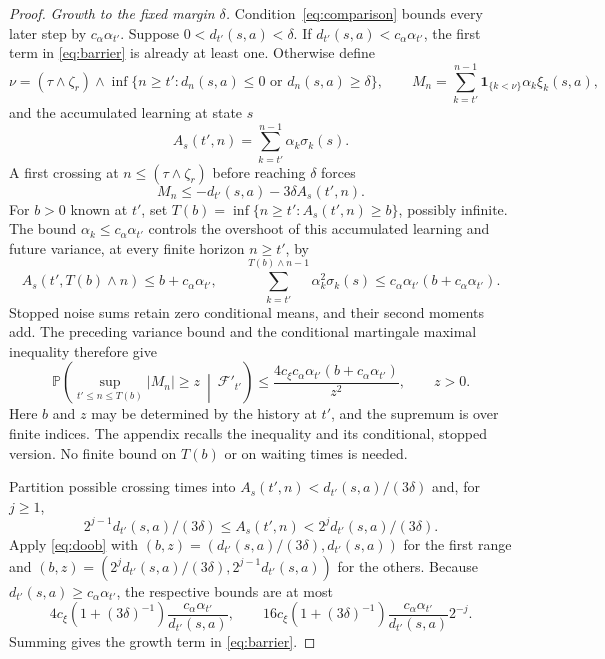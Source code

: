 \begin{proof}
\emph{Growth to the fixed margin $\delta$.} Condition~\eqref{eq:comparison} bounds every later step by $c_\alpha\alpha_{t'}$. Suppose $0<d_{t'}(s,a)<\delta$. If $d_{t'}(s,a)<c_\alpha\alpha_{t'}$, the first term in \eqref{eq:barrier} is already
at least one. Otherwise define
\[
\nu=(\tau\wedge\zeta_r)\wedge\inf\{n\ge t':d_n(s,a)\le0\text{ or }d_n(s,a)\ge\delta\},\qquad
M_n=\sum_{k=t'}^{n-1}\mathbf1_{\{k<\nu\}}\alpha_k\xi_k(s,a),
\]
and the accumulated learning at state $s$
\begin{equation}\label{eq:clock}
A_s(t',n)=\sum_{k=t'}^{n-1}\alpha_k\sigma_k(s).
\end{equation}
A first crossing at $n\le(\tau\wedge\zeta_r)$ before reaching $\delta$ forces
\begin{equation}\label{eq:crossing}
M_n\le-d_{t'}(s,a)-3\delta A_s(t',n).
\end{equation}
For $b>0$ known at $t'$, set $T(b)=\inf\{n\ge t':A_s(t',n)\ge b\}$, possibly infinite. The bound $\alpha_k\le c_\alpha\alpha_{t'}$ controls the overshoot of this accumulated learning and future variance, at every finite horizon $n\ge t'$, by
\[
A_s(t',T(b)\wedge n)\le b+c_\alpha\alpha_{t'},\qquad
\sum_{k=t'}^{T(b)\wedge n-1}\alpha_k^2\sigma_k(s)\le c_\alpha\alpha_{t'}(b+c_\alpha\alpha_{t'}).
\]
Stopped noise sums retain zero conditional means, and their second moments add. The preceding variance bound and the conditional martingale maximal inequality therefore give
\begin{equation}\label{eq:doob}
\mathbb P\!\left(\sup_{t'\le n\le T(b)}|M_n|\ge z\ \middle|\ \mathcal F'_{t'}\right)
\le\frac{4c_\xi c_\alpha\alpha_{t'}(b+c_\alpha\alpha_{t'})}{z^2},\qquad z>0.
\end{equation}
Here $b$ and $z$ may be determined by the history at $t'$, and the supremum is over finite indices. The appendix recalls the inequality and its conditional, stopped version. No finite bound on $T(b)$ or on waiting times is needed.

Partition possible crossing times into $A_s(t',n)<d_{t'}(s,a)/(3\delta)$ and, for $j\ge1$,
\[
2^{j-1}d_{t'}(s,a)/(3\delta)\le A_s(t',n)<2^jd_{t'}(s,a)/(3\delta).
\]
Apply \eqref{eq:doob} with $(b,z)=(d_{t'}(s,a)/(3\delta),d_{t'}(s,a))$ for the first range and $(b,z)=(2^jd_{t'}(s,a)/(3\delta),2^{j-1}d_{t'}(s,a))$
for the others. Because $d_{t'}(s,a)\ge c_\alpha\alpha_{t'}$, the respective bounds are at most
\[
4c_\xi(1+(3\delta)^{-1})\frac{c_\alpha\alpha_{t'}}{d_{t'}(s,a)},\qquad
16c_\xi(1+(3\delta)^{-1})\frac{c_\alpha\alpha_{t'}}{d_{t'}(s,a)}2^{-j}.
\]
Summing gives the growth term in \eqref{eq:barrier}.


\end{proof}
